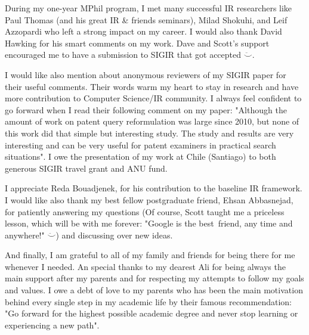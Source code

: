 During my one-year MPhil program, I met many successful IR researchers like Paul Thomas (and his great IR \& friends seminars), Milad Shokuhi, and Leif Azzopardi who left a strong impact on my career. I would also thank David Hawking for his smart comments on my work. Dave and Scott's support encouraged me to have a submission to SIGIR that got accepted $\ddot\smile$. 

I would like also mention about anonymous reviewers of my SIGIR paper  for their useful comments. Their words warm my heart to stay in research and have more contribution to Computer Science/IR community. I always feel confident to go forward when I read their following comment on my paper: "Although the amount of work on patent query reformulation was large since 2010, but none of this work did that simple but interesting study. The study and results are very interesting and can be very useful for patent examiners in practical search situations". I owe the presentation of my work at Chile (Santiago) to both generous SIGIR travel grant and ANU fund. 

I appreciate Reda Bouadjenek, for his contribution to the baseline IR framework. I would like also thank my best fellow postgraduate friend, Ehsan Abbasnejad, for patiently answering my questions (Of course, Scott taught me a priceless lesson, which will be with me forever: "Google is the best~friend, any time and anywhere!" $\ddot\smile$) and discussing over new ideas.

And finally, I am grateful to all of my family and friends for being there for me whenever I needed. An special thanks to my dearest Ali for being always the main support after my parents and for respecting my attempts to follow my goals and values. I owe a debt of love to my parents who has been the main motivation behind every single step in my academic life by their famous recommendation: "Go forward for the highest possible academic degree and never stop learning or experiencing a new path". 